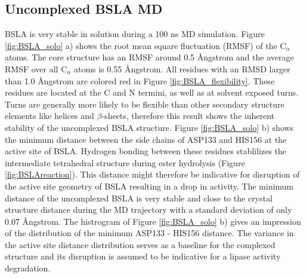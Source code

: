 \documentclass[english, a4paper, 12pt, titlepage, draft]{article}
\begin{document}
\subsection{Uncomplexed BSLA MD}

BSLA is very stable in solution during a 100 ns MD simulation.
Figure \ref{fig:BSLA_solo} a) shows the root mean square fluctuation (RMSF) of the C$_{\alpha}$ atoms.
The core structure has an RMSF around 0.5 \r{A}ngstrom and the average RMSF over all C$_{\alpha}$ atoms is 0.55 \r{A}ngstrom.
All residues with an RMSD larger than 1.0 \r{A}ngstrom are colored red in Figure \ref{fig:BSLA_flexibility}.
These residues are located at the C and N termini, as well as at solvent exposed turns.
Turns are generally more likely to be flexible than other secondary structure elements like helices and $\beta$-sheets, therefore this result shows the inherent stability of the uncomplexed BSLA structure.
Figure \ref{fig:BSLA_solo} b) shows the minimum distance between the side chains of ASP133 and HIS156 at the active site of BSLA.
Hydrogen bonding between these residues stablilizes the intermediate tetrahedral structure during ester hydrolysis (Figure \ref{fig:BSLAreaction}).
This distance might therefore be indicative for disruption of the active site geometry of BSLA resulting in a drop in activity.
The minimum distance of the uncomplexed BSLA is very stable and close to the crystal structure distance during the MD trajectory with a standard deviation of only 0.07 \r{A}ngstrom.
The histrogram of Figure \ref{fig:BSLA_solo} b) gives an impression of the distribution of the minimum ASP133 - HIS156 distance.
The variance in the active site distance distribution serves as a baseline for the complexed structure and its disruption is assumed to be indicative for a lipase activity degradation.
\end{document}

